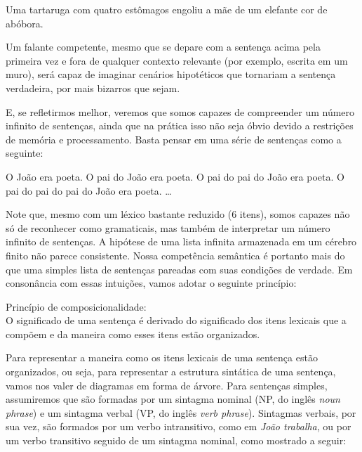 \begin{exe}
    \ex Uma tartaruga com quatro estômagos engoliu a mãe de um elefante cor de
    abóbora. \label{wabaq}
\end{exe}

\n Um falante competente, mesmo que se depare com a sentença acima
pela primeira vez e fora de qualquer contexto relevante (por
exemplo, escrita em um muro), será capaz de imaginar cenários
hipotéticos que tornariam a sentença verdadeira, por mais bizarros
que sejam.


E, se refletirmos melhor, veremos que somos capazes de compreender
um número infinito de sen\-ten\-ças, ainda que na prática isso não
seja óbvio devido a restri\-çõ\-es de memória e processamento.
Basta pensar em uma série
de sen\-ten\-ças como a seguinte:

\begin{exe}
\ex \begin{xlist}
		\ex O João era poeta.
		\ex O pai do João era poeta.
		\ex O pai do pai do João era poeta.
		\ex O pai do pai do pai do João era poeta.
		\ex \ldots
	\end{xlist}
\end{exe}


\n Note que, mesmo com um léxico bastante reduzido (6 itens), somos
capazes não só de reconhecer como gramaticais, mas também de
interpretar um número infinito de sentenças. A hipótese de uma
lista infinita armazenada em um cérebro finito não parece
consistente. Nossa competência semântica é portanto mais do que
uma simples lista de sen\-ten\-ças pareadas com suas condi\-çõ\-es
de verdade. Em consonância com essas intui\-çõ\-es, vamos adotar o
seguinte prin\-cí\-pio:


	
\begin{exe}
	\ex Princípio de composicionalidade:\\
	O significado de uma sentença é derivado do significado dos itens lexicais que a compõem e da maneira como esses itens estão organizados.
\end{exe}





\n Para representar a maneira como os itens lexicais de uma
sentença estão organizados, ou seja, para representar a estrutura
sintática de uma sentença, vamos nos valer de diagramas em forma
de árvore. Para sen\-ten\-ças simples, assumiremos que são
formadas por um sintagma nominal (NP, do inglês \textit{noun phrase}) e um sintagma verbal (VP, do inglês \textit{verb phrase}).
Sintagmas verbais, por sua vez, são formados por um verbo intransitivo, como em \textit{João trabalha}, ou por um
verbo transitivo seguido de um sintagma nominal, como mostrado a
seguir:

